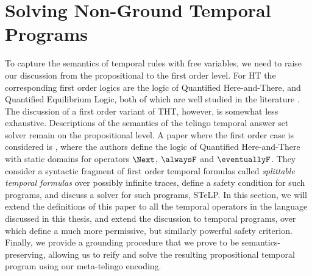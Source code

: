 \section{Solving Non-Ground Temporal Programs}

To capture the semantics of temporal rules with free variables, we need to raise
our discussion from the propositional to the first order level. For HT
the corresponding first order logics are the logic of Quantified
Here-and-There, and Quantified Equilibrium Logic, both of which are
well studied in the literature \cite{peaval06a} \cite{peaval08a}. The
discussion of a first order variant of THT, however, is somewhat less
exhaustive. Descriptions of the semantics of the telingo temporal
answer set solver remain on the propositional level. A paper where the
first order case is considered is \cite{agcapevidi17a}, where the
authors define the logic of Quantified Here-and-There with static
domains for operators $\Next$, $\alwaysF$ and $\eventuallyF$. They
consider a syntactic fragment of first order temporal formulas called
\emph{splittable temporal formulas} over possibly infinite traces,
define a safety condition for such programs, and discuss a solver for
such programs, STeLP. In this section, we will extend the definitions
of this paper to all the temporal operators in the language discussed
in this thesis, and extend the discussion to temporal programs, over which define a
much more permissive, but similarly powerful safety
criterion. Finally, we provide a grounding procedure that we prove to
be semantics-preserving, allowing us to reify and solve the resulting
propositional temporal program using our meta-telingo encoding.





